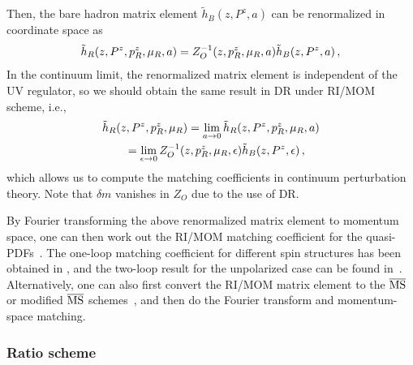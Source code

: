 \documentclass[aps,rmp,reprint,amsmath,amssymb,graphicx,longbibliography]{revtex4-1} %
\newcommand{\MS}{{\overline{\rm MS}}}
\newcommand{\nn}{\nonumber}
\begin{document}
Then, the bare hadron matrix element $\tilde{h}_B(z,P^z,a)$ can be renormalized in coordinate space as
\begin{align} \label{eq:rimomh}
	\tilde{h}_R(z,P^z, p_{\tiny R}^z,\mu_{\tiny R},a)=Z^{-1}_{O}(z,p_{\tiny R}^z,\mu_{\tiny R},a)\tilde{h}_B(z,P^z,a) \,,
\end{align}
In the continuum limit, the renormalized matrix element is independent of the UV regulator, so we should obtain the same result in DR under RI/MOM scheme, i.e.,
\begin{align}\label{eq:continuum}
	&\tilde{h}_R(z,P^z, p_{\tiny R}^z,\mu_{\tiny R})=\lim_{a\to0}\tilde{h}_R(z,P^z, p_{\tiny R}^z,\mu_{\tiny R},a) \nn\\
	&\qquad = \lim_{\epsilon\to0}Z^{-1}_{O}(z,p_{\tiny R}^z,\mu_{\tiny R},\epsilon)\tilde{h}_B(z,P^z,\epsilon)\,,
\end{align}
which allows us to compute the matching coefficients in continuum perturbation theory. Note that $\delta m$ vanishes in $Z_{O}$ due to the use of DR.

By Fourier transforming the above renormalized matrix element to momentum space, one can then work out the RI/MOM matching coefficient for the quasi-PDFs~\cite{Stewart:2017tvs}. The one-loop matching coefficient for different spin structures has been obtained in \cite{Stewart:2017tvs,Liu:2018uuj,Liu:2018hxv}, and the two-loop result for the unpolarized case can be found in~\cite{Chen:2020ody}. Alternatively, one can also first convert the RI/MOM matrix element to the $\MS$ or modified $\MS$ schemes~\cite{Constantinou:2017sej,Alexandrou:2019lfo}, and then do the Fourier transform and momentum-space matching.

\subsubsection{Ratio scheme}
\label{sec:renorm-npr-ratio}
\end{document}
